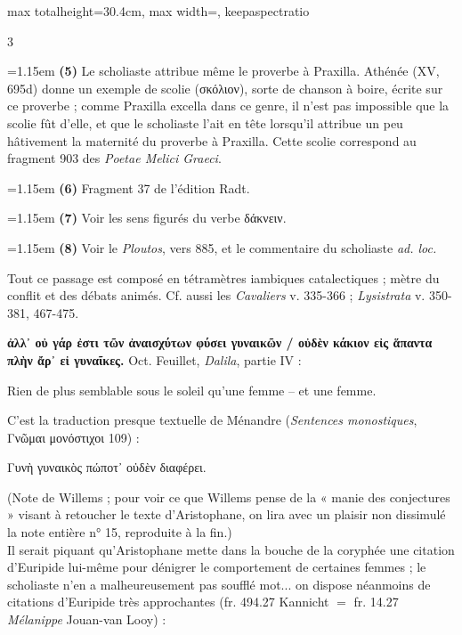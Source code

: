 \documentclass[11pt,twoside]{book}
\newcommand{\italique}[1]{\textit{#1}}
\newcommand{\citComm}[1]{\begin{quoting}[vskip=0.4pt,leftmargin=0.7em,rightmargin=0.2em]#1\end{quoting}}
\newcommand{\francais}[1]{{\policeFr #1}}
\begin{document}
\begin{adjustbox}{max totalheight=30.4cm, max width=\textwidth, keepaspectratio}
\begin{minipage}{\textwidth}
{\begin{multicols}{3}
\par\vspace{1.5pt}
\noindent\hangindent=1.15em {\color{sepiaNote}\textbf{(5)}} Le scholiaste attribue même le proverbe à Praxilla. Athénée (XV, 695d) donne un exemple de scolie (σκόλιον), sorte de chanson à boire, écrite sur ce proverbe ; comme Praxilla excella dans ce genre, il n'est pas impossible que la scolie fût d'elle, et que le scholiaste l'ait en tête lorsqu'il attribue un peu hâtivement la maternité du proverbe à Praxilla. Cette scolie correspond au fragment 903 des \italique{Poetae Melici Graeci}.
\par\vspace{1.5pt}
\noindent\hangindent=1.15em {\color{sepiaNote}\textbf{(6)}} Fragment 37 de l'édition Radt.
\par\vspace{1.5pt}
\noindent\hangindent=1.15em {\color{sepiaNote}\textbf{(7)}} Voir les sens figurés du verbe δάκνειν.
\par\vspace{1.5pt}
\noindent\hangindent=1.15em {\color{sepiaNote}\textbf{(8)}} Voir le \italique{Ploutos}, vers 885, et le commentaire du scholiaste \italique{ad. loc.}
\par\vspace{1.5pt}
 \textbf{} Tout ce passage est composé en tétramètres iambiques catalectiques ; mètre du conflit et des débats animés. Cf. aussi les \italique{Cavaliers} v. 335-366 ; \italique{Lysistrata} v. 350-381, 467-475.
\par\vspace{1.5pt}
 \textbf{ἀλλ᾽ οὐ γάρ ἐστι τῶν ἀναισχύτων φύσει γυναικῶν / οὐδὲν κάκιον εἰς ἅπαντα πλὴν ἄρ᾽ εἰ γυναῖκες.} Oct. Feuillet, \italique{Dalila}, partie IV :
\citComm{\francais{Rien de plus semblable sous le soleil qu'une femme – et une femme.}}
\par\vspace{1.5pt}
\noindent C'est la traduction presque textuelle de Ménandre (\italique{Sentences monostiques}, Γνῶμαι μονόστιχοι 109) :
\citComm{Γυνὴ γυναικὸς πώποτ᾽ οὐδὲν διαφέρει.}
\par\vspace{1.5pt}
\noindent (Note de Willems ; pour voir ce que Willems pense de la « manie des conjectures » visant à retoucher le texte d'Aristophane, on lira avec un plaisir non dissimulé la note entière n° 15, reproduite à la fin.)\\ Il serait piquant qu'Aristophane mette dans la bouche de la coryphée une citation d'Euripide lui-même pour dénigrer le comportement de certaines femmes ; le scholiaste n'en a malheureusement pas soufflé mot... on dispose néanmoins de citations d'Euripide très approchantes (fr. 494.27 Kannicht $=$ fr. 14.27 \italique{Mélanippe} Jouan-van Looy) :

\end{multicols}}
\end{minipage}
\end{adjustbox}
\end{document}
